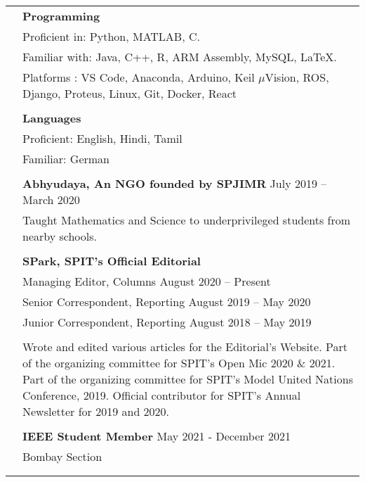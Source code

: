 \documentclass[letterpaper, 10pt]{article}
\begin{document}
\begin{longtable}{p{1.3in}p{4.8in}}

{\color{OliveGreen}{Skills}} 
& \textbf{Programming}\\
& Proficient in: Python, MATLAB, C. \\
& Familiar with: Java, C++, R, ARM Assembly, MySQL, \LaTeX. \\
& Platforms : VS Code, Anaconda, Arduino, Keil $\mu$Vision, ROS, Django, Proteus, Linux, Git, Docker, React \\
& \\

& \textbf{Languages} \\
& Proficient: English, Hindi, Tamil\\
& Familiar: German \\
& \\


\color{OliveGreen}{Service and outreach}
& \textbf{Abhyudaya, An NGO founded by SPJIMR} \hfill July 2019 – March 2020 \\
& Taught Mathematics and Science to underprivileged students from nearby schools. \\
& \\


{\color{OliveGreen}{Professional}} 
& {\textbf{SPark, SPIT’s Official Editorial}} \hfill \\
{\color{OliveGreen}{Memberships}} 
& Managing Editor, Columns \hfill August 2020 – Present \\
& Senior Correspondent, Reporting \hfill August 2019 – May 2020\\
& Junior Correspondent, Reporting \hfill August 2018 – May 2019 \\
& \\
& Wrote and edited various articles for the Editorial’s Website. Part of the organizing committee for SPIT’s Open Mic 2020 \& 2021. Part of the organizing committee for SPIT’s Model United Nations Conference, 2019. Official contributor for SPIT’s Annual Newsletter for 2019 and 2020.\\
\\

& {\textbf{IEEE Student Member}} \hfill May 2021 - December 2021\\
& Bombay Section\\
& \\
\\


\end{longtable}
\end{document}
